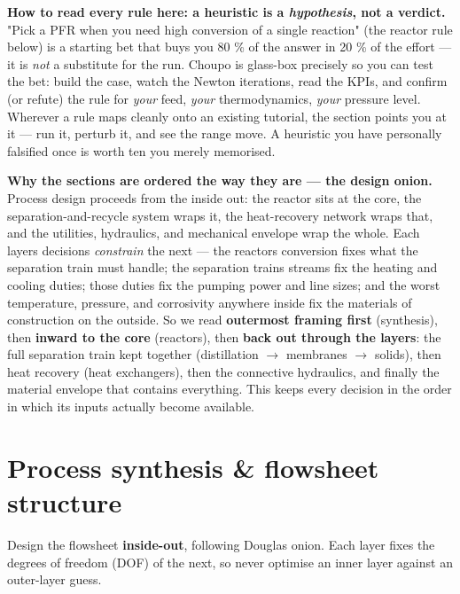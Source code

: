 \documentclass[11pt,a4paper]{article}
\begin{document}
\textbf{How to read every rule here: a heuristic is a \emph{hypothesis},
not a verdict.} "Pick a PFR when you need high conversion of a single
reaction" (the reactor rule below) is a starting bet that buys you 80 \% of the answer in 20 \% of the
effort --- it is \emph{not} a substitute for the run. Choupo is
glass-box precisely so you can test the bet: build the case, watch the
Newton iterations, read the KPIs, and confirm (or refute) the rule for
\emph{your} feed, \emph{your} thermodynamics, \emph{your} pressure
level. Wherever a rule maps cleanly onto an existing tutorial, the
section points you at it --- run it, perturb it, and see the range move.
A heuristic you have personally falsified once is worth ten you merely
memorised.

\textbf{Why the sections are ordered the way they are --- the design
onion.} Process design proceeds from the inside out: the reactor sits at
the core, the separation-and-recycle system wraps it, the heat-recovery
network wraps that, and the utilities, hydraulics, and mechanical
envelope wrap the whole. Each layer\textquotesingle s decisions
\emph{constrain} the next --- the reactor\textquotesingle s conversion
fixes what the separation train must handle; the separation
train\textquotesingle s streams fix the heating and cooling duties;
those duties fix the pumping power and line sizes; and the worst
temperature, pressure, and corrosivity anywhere inside fix the materials
of construction on the outside. So we read \textbf{outermost framing
first} (synthesis), then \textbf{inward to the core} (reactors), then
\textbf{back out through the layers}: the full separation train kept
together (distillation \(\rightarrow\) membranes \(\rightarrow\) solids), then heat recovery (heat
exchangers), then the connective hydraulics, and finally the material
envelope that contains everything. This keeps every decision in the
order in which its inputs actually become available.

\hypertarget{process-synthesis--flowsheet-structure}{%
\section{Process synthesis \& flowsheet
structure}\label{process-synthesis--flowsheet-structure}}

Design the flowsheet \textbf{inside-out}, following
Douglas\textquotesingle{} onion. Each layer fixes the degrees of freedom
(DOF) of the next, so never optimise an inner layer against an
outer-layer guess.
\end{document}
